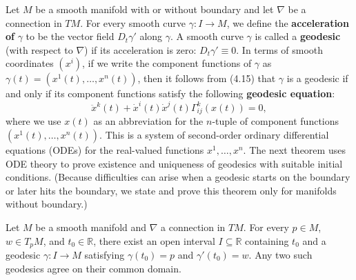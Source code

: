 Let $M$ be a smooth manifold with or without boundary and let $\nabla$ be a connection in $TM$. For every smooth curve $\gamma: I \to M$, we define the \textbf{acceleration of} $\gamma$ to be the vector field $D_t \gamma'$ along $\gamma$. A smooth curve $\gamma$ is called a \textbf{geodesic} (with respect to $\nabla$) if its acceleration is zero: $D_t \gamma' \equiv 0$. In terms of smooth coordinates $(x^i)$, if we write the component functions of $\gamma$ as $\gamma(t) = (x^1(t), \ldots, x^n(t))$, then it follows from (4.15) that $\gamma$ is a geodesic if and only if its component functions satisfy the following \textbf{geodesic equation}:
\begin{equation}
\ddot{x}^k(t) + \dot{x}^i(t) \dot{x}^j(t) \Gamma^k_{ij}(x(t)) = 0, \tag{4.16}
\end{equation}
where we use $x(t)$ as an abbreviation for the $n$-tuple of component functions $(x^1(t), \ldots, x^n(t))$. This is a system of second-order ordinary differential equations (ODEs) for the real-valued functions $x^1, \ldots, x^n$. The next theorem uses ODE theory to prove existence and uniqueness of geodesics with suitable initial conditions. (Because difficulties can arise when a geodesic starts on the boundary or later hits the boundary, we state and prove this theorem only for manifolds without boundary.)

\begin{theorem}
\label{thm:geodesic-existence-uniqueness}
Let $M$ be a smooth manifold and $\nabla$ a connection in $TM$. For every $p \in M$, $w \in T_p M$, and $t_0 \in \mathbb{R}$, there exist an open interval $I \subseteq \mathbb{R}$ containing $t_0$ and a geodesic $\gamma: I \to M$ satisfying $\gamma(t_0) = p$ and $\gamma'(t_0) = w$. Any two such geodesics agree on their common domain.
\end{theorem}

